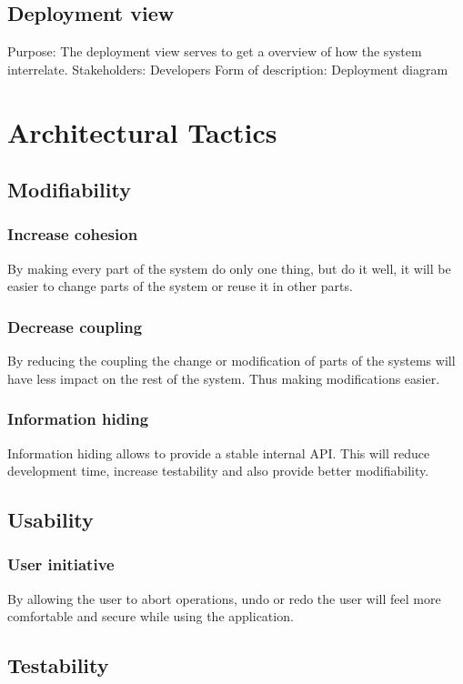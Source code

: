 \documentclass[11pt]{book}
\begin{document}
\subsection{Deployment view}
Purpose: The deployment view serves to get a overview of how the system interrelate.
Stakeholders: Developers
Form of description: Deployment diagram

\section{Architectural Tactics}

\subsection{Modifiability}

\subsubsection{Increase cohesion}
By making every part of the system do only one thing, but do it well, it will be easier to change parts of the system or reuse it in other parts.

\subsubsection{Decrease coupling}
By reducing the coupling the change or modification of parts of the systems will have less impact on the rest of the system. Thus making modifications easier.

\subsubsection{Information hiding}
Information hiding allows to provide a stable internal API. This will reduce development time, increase testability and also provide better modifiability.

\subsection{Usability}

\subsubsection{User initiative}
By allowing the user to abort operations, undo or redo the user will feel more comfortable and secure while using the application.

\subsection{Testability}
\end{document}
